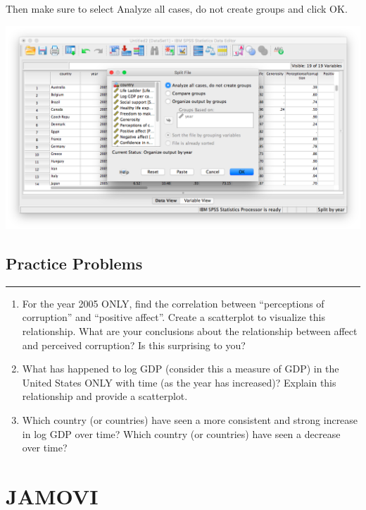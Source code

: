 \documentclass[
]{book}
\begin{document}
Then make sure to select {Analyze all cases, do not create groups} and click {OK}.

\includegraphics{img/3.4.36.png}

\hypertarget{practice-problems-2}{%
\subsection{Practice Problems}\label{practice-problems-2}}

\begin{center}\rule{0.5\linewidth}{0.5pt}\end{center}

\begin{enumerate}
\def\labelenumi{\arabic{enumi}.}
\item
  For the year 2005 ONLY, find the correlation between ``perceptions of corruption'' and ``positive affect''. Create a scatterplot to visualize this relationship. What are your conclusions about the relationship between affect and perceived corruption? Is this surprising to you?
\item
  What has happened to log GDP (consider this a measure of GDP) in the United States ONLY with time (as the year has increased)? Explain this relationship and provide a scatterplot.
\item
  Which country (or countries) have seen a more consistent and strong increase in log GDP over time? Which country (or countries) have seen a decrease over time?
\end{enumerate}

\hypertarget{jamovi-3}{%
\section{JAMOVI}\label{jamovi-3}}
\end{document}
